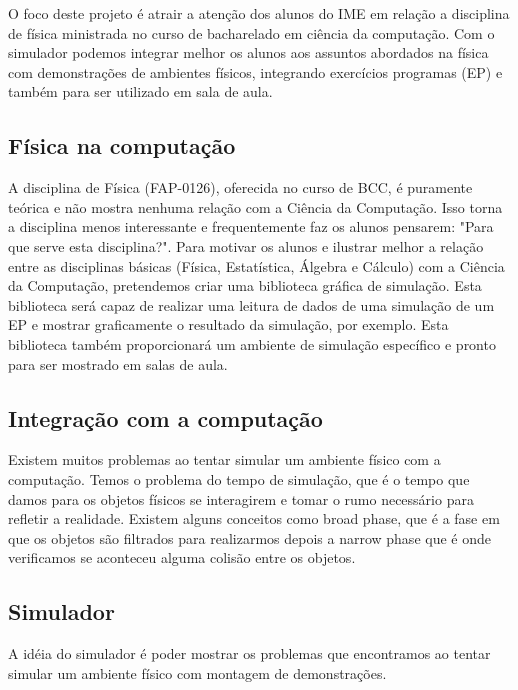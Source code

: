 
O foco deste projeto é atrair a atenção dos alunos do IME em relação a disciplina de física ministrada no curso de bacharelado em ciência da computação.
Com o simulador podemos integrar melhor os alunos aos assuntos abordados na física com demonstrações de ambientes físicos, 
integrando exercícios programas (EP) e também para ser utilizado em sala de aula.

\subsection{Física na computação}

A disciplina de Física (FAP-0126), oferecida no curso de BCC, é puramente teórica e não mostra nenhuma relação com a Ciência da Computação. Isso torna a disciplina menos interessante e frequentemente faz os alunos pensarem: "Para que serve esta disciplina?".
Para motivar os alunos e ilustrar melhor a relação entre as disciplinas básicas (Física, Estatística, Álgebra e Cálculo) com a Ciência da Computação, pretendemos criar uma biblioteca gráfica de simulação. Esta biblioteca será capaz de realizar uma leitura de dados de uma simulação de um EP e mostrar graficamente o resultado da simulação, por exemplo.
Esta biblioteca também proporcionará um ambiente de simulação específico e pronto para ser mostrado em salas de aula.
\subsection{Integração com a computação}

Existem muitos problemas ao tentar simular um ambiente físico com a computação. Temos o problema do tempo de simulação, 
que é o tempo que damos para os objetos físicos se interagirem e tomar o rumo necessário para refletir a realidade.
Existem alguns conceitos como broad phase, que é a fase em que os objetos são filtrados para realizarmos depois a narrow phase que é onde verificamos se aconteceu 
alguma colisão entre os objetos.

\subsection{Simulador}

A idéia do simulador é poder mostrar os problemas que encontramos ao tentar simular um ambiente físico com montagem de demonstrações. 
